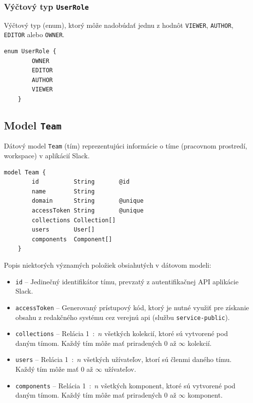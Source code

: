 \subsubsection{Výčtový typ \texttt{UserRole}}
Výčtový typ (enum), ktorý môže nadobúdať jednu z hodnôt \texttt{VIEWER}, \texttt{AUTHOR}, \texttt{EDITOR} alebo \texttt{OWNER}. \\

\begin{lstlisting}[caption=Výčtový typ \texttt{UserRole} v konfiguračnom súbore \texttt{prisma}.]
	enum UserRole {
		OWNER
		EDITOR
		AUTHOR
		VIEWER
	}
\end{lstlisting}

\subsection{Model \texttt{Team}}
Dátový model \texttt{Team} (tím) reprezentujúci informácie o tíme (pracovnom prostredí, workspace) v aplikácií Slack. \\

\begin{lstlisting}[caption=Dátový model \texttt{Team} v konfiguračnom súbore \texttt{prisma}.]
	model Team {
		id          String       @id
		name        String
		domain      String       @unique
		accessToken String       @unique
		collections Collection[]
		users       User[]
		components  Component[]
	}
\end{lstlisting}

\bigskip

\noindent Popis niektorých významých položiek obsiahutých v dátovom modeli:

\begin{itemize}
	\item \texttt{id} -- Jedinečný identifikátor tímu, prevzatý z autentifikačnej API aplikácie Slack.
	\item \texttt{accessToken} -- Generovaný prístupový kód, ktorý je nutné využiť pre získanie obsahu z redakčného systému cez verejnú api (službu \texttt{service-public}). 
	\item \texttt{collections} -- Relácia 1~:~$n$ všetkých kolekcií, ktoré sú vytvorené pod daným tímom. Každý tím môže mať priradených 0 až $\infty$ kolekcií.
	\item \texttt{users} -- Relácia 1~:~$n$ všetkých užívateľov, ktorí sú členmi daného tímu. Každý tím môže mať 0 až $\infty$ užívateľov.
	\item \texttt{components} -- Relácia 1~:~$n$ všetkých komponent, ktoré sú vytvorené pod daným tímom. Každý tím môže mať priradených 0 až $\infty$ komponent.
\end{itemize}

